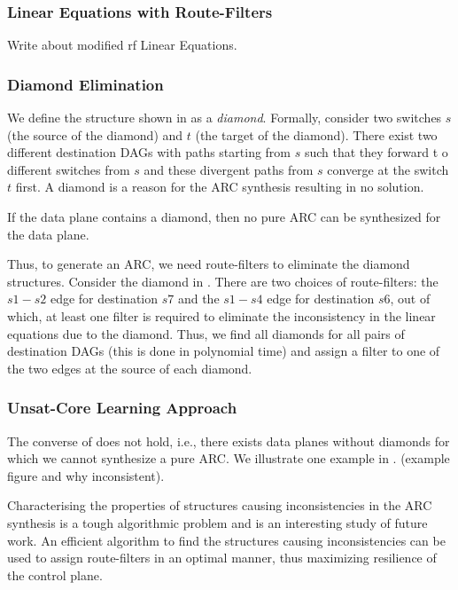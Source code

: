 \subsubsection{Linear Equations with Route-Filters}
Write about modified rf Linear Equations.

\subsubsection{Diamond Elimination}
We define the structure shown in 
as a \emph{diamond}. Formally,
consider two switches $s$ (the source of the diamond) 
and $t$ (the target of the diamond).
There exist two different destination DAGs with 
paths starting from $s$ such that they forward t
o different switches from $s$  
and these divergent paths from $s$ converge
at the switch $t$ first. A diamond is 
a reason for the ARC synthesis resulting in no
solution. 
\begin{theorem} \label{thm:diamond}
If the data plane contains a diamond, then no pure ARC  
can be synthesized for the data plane.
\end{theorem}
Thus, to generate an ARC, we need route-filters
to eliminate the diamond structures. Consider
the diamond in . There are two choices
of route-filters: the $s1-s2$ edge for destination $s7$ 
and the $s1-s4$ edge for destination $s6$, out of which,
at least one filter is required to eliminate the 
inconsistency in the linear equations due to the diamond.
Thus, we find all diamonds for all pairs of destination
DAGs (this is done in polynomial time) and assign a filter
to one of the two edges at the source of each diamond. 

\subsubsection{Unsat-Core Learning Approach}
The converse of  does not hold, i.e.,
there exists data planes without diamonds for which
we cannot synthesize a pure ARC. We illustrate one example
in \Cref{}. (example figure and why inconsistent). 

Characterising the properties of structures causing
inconsistencies in the ARC synthesis is a tough algorithmic
problem and is an interesting study of future work. An
efficient algorithm to find the structures causing 
inconsistencies can be used to assign route-filters in an
optimal manner, thus maximizing resilience of the control plane.

